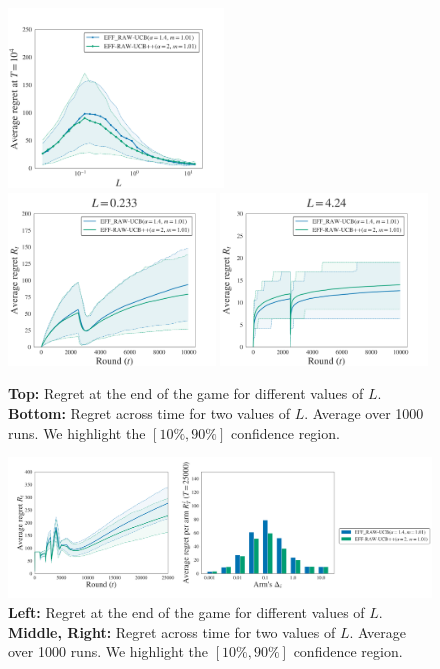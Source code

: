 \begin{figure}[ht]
\centering
\includegraphics[clip, width= 0.51\textwidth]{2.1Rested/fig/fig1A_pp.pdf}
\includegraphics[clip, width= 0.49\textwidth]{2.1Rested/fig/fig1B_pp.pdf}
\includegraphics[clip, width= 0.49\textwidth]{2.1Rested/fig/fig1C_pp.pdf}
\caption{\textbf{Top:} Regret at the end of the game for different values of $L$. \textbf{Bottom:} Regret across time for two values of $L$. Average over 1000 runs. We highlight the $\left[10\%, 90\%\right]$ confidence region.}
\label{fig:rested-pp1}
\end{figure}


\begin{figure}[ht]
\centering
\includegraphics[width = 0.99 \textwidth]{2.1Rested/fig/fig2_pp.pdf}
\caption{\textbf{Left:} Regret at the end of the game for different values of $L$. \textbf{Middle, Right:} Regret across time for two values of $L$. Average over 1000 runs. We highlight the $\left[10\%, 90\%\right]$ confidence region.}
\label{fig:rested-pp2}
\end{figure}


